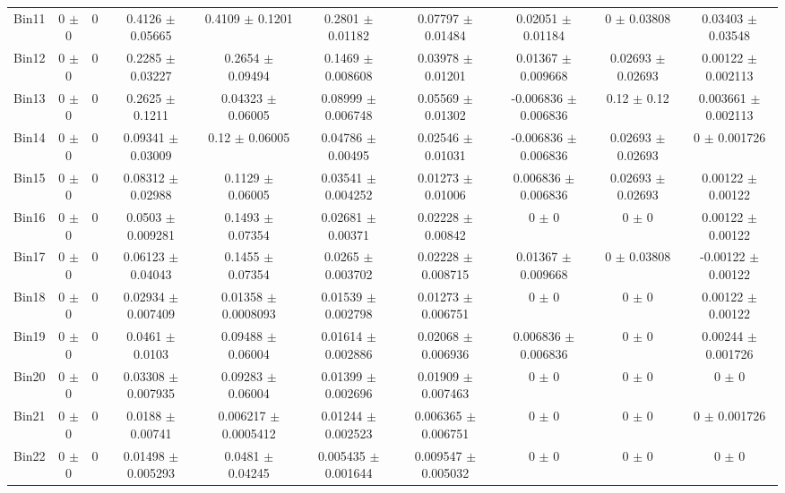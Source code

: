 \begin{tabular}{@{\extracolsep{4pt}}lccccccccc@{}}
     Bin11 & 0 $\pm$ 0 & 0 & 0.4126 $\pm$ 0.05665 & 0.4109 $\pm$ 0.1201 & 0.2801 $\pm$ 0.01182 & 0.07797 $\pm$ 0.01484 & 0.02051 $\pm$ 0.01184 & 0 $\pm$ 0.03808 & 0.03403 $\pm$ 0.03548 \\ 
     Bin12 & 0 $\pm$ 0 & 0 & 0.2285 $\pm$ 0.03227 & 0.2654 $\pm$ 0.09494 & 0.1469 $\pm$ 0.008608 & 0.03978 $\pm$ 0.01201 & 0.01367 $\pm$ 0.009668 & 0.02693 $\pm$ 0.02693 & 0.00122 $\pm$ 0.002113 \\ 
     Bin13 & 0 $\pm$ 0 & 0 & 0.2625 $\pm$ 0.1211 & 0.04323 $\pm$ 0.06005 & 0.08999 $\pm$ 0.006748 & 0.05569 $\pm$ 0.01302 & -0.006836 $\pm$ 0.006836 & 0.12 $\pm$ 0.12 & 0.003661 $\pm$ 0.002113 \\ 
     Bin14 & 0 $\pm$ 0 & 0 & 0.09341 $\pm$ 0.03009 & 0.12 $\pm$ 0.06005 & 0.04786 $\pm$ 0.00495 & 0.02546 $\pm$ 0.01031 & -0.006836 $\pm$ 0.006836 & 0.02693 $\pm$ 0.02693 & 0 $\pm$ 0.001726 \\ 
     Bin15 & 0 $\pm$ 0 & 0 & 0.08312 $\pm$ 0.02988 & 0.1129 $\pm$ 0.06005 & 0.03541 $\pm$ 0.004252 & 0.01273 $\pm$ 0.01006 & 0.006836 $\pm$ 0.006836 & 0.02693 $\pm$ 0.02693 & 0.00122 $\pm$ 0.00122 \\ 
     Bin16 & 0 $\pm$ 0 & 0 & 0.0503 $\pm$ 0.009281 & 0.1493 $\pm$ 0.07354 & 0.02681 $\pm$ 0.00371 & 0.02228 $\pm$ 0.00842 & 0 $\pm$ 0 & 0 $\pm$ 0 & 0.00122 $\pm$ 0.00122 \\ 
     Bin17 & 0 $\pm$ 0 & 0 & 0.06123 $\pm$ 0.04043 & 0.1455 $\pm$ 0.07354 & 0.0265 $\pm$ 0.003702 & 0.02228 $\pm$ 0.008715 & 0.01367 $\pm$ 0.009668 & 0 $\pm$ 0.03808 & -0.00122 $\pm$ 0.00122 \\ 
     Bin18 & 0 $\pm$ 0 & 0 & 0.02934 $\pm$ 0.007409 & 0.01358 $\pm$ 0.0008093 & 0.01539 $\pm$ 0.002798 & 0.01273 $\pm$ 0.006751 & 0 $\pm$ 0 & 0 $\pm$ 0 & 0.00122 $\pm$ 0.00122 \\ 
     Bin19 & 0 $\pm$ 0 & 0 & 0.0461 $\pm$ 0.0103 & 0.09488 $\pm$ 0.06004 & 0.01614 $\pm$ 0.002886 & 0.02068 $\pm$ 0.006936 & 0.006836 $\pm$ 0.006836 & 0 $\pm$ 0 & 0.00244 $\pm$ 0.001726 \\ 
     Bin20 & 0 $\pm$ 0 & 0 & 0.03308 $\pm$ 0.007935 & 0.09283 $\pm$ 0.06004 & 0.01399 $\pm$ 0.002696 & 0.01909 $\pm$ 0.007463 & 0 $\pm$ 0 & 0 $\pm$ 0 & 0 $\pm$ 0 \\ 
     Bin21 & 0 $\pm$ 0 & 0 & 0.0188 $\pm$ 0.00741 & 0.006217 $\pm$ 0.0005412 & 0.01244 $\pm$ 0.002523 & 0.006365 $\pm$ 0.006751 & 0 $\pm$ 0 & 0 $\pm$ 0 & 0 $\pm$ 0.001726 \\ 
     Bin22 & 0 $\pm$ 0 & 0 & 0.01498 $\pm$ 0.005293 & 0.0481 $\pm$ 0.04245 & 0.005435 $\pm$ 0.001644 & 0.009547 $\pm$ 0.005032 & 0 $\pm$ 0 & 0 $\pm$ 0 & 0 $\pm$ 0 \\ 

\end{tabular}
